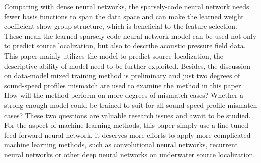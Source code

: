 Comparing with dense neural networks, the sparsely-code neural network needs fewer basis functions to span the data space and can make the learned weight coefficient show group structure, which is beneficial to the feature selection.
These mean the learned sparsely-code neural network model can be used not only to predict source localization, but also to describe acoustic pressure field data. This paper mainly utilizes the model to predict source localization, the descriptive ability of model need to be further exploited.
Besides, the discussion on data-model mixed training method is preliminary and just two degrees of sound-speed profiles mismatch are used to
examine the method in this paper. How will the method perform on more degrees of mismatch cases? Whether a strong enough model could be trained to suit for all sound-speed profile mismatch cases? These two questions are valuable research issues and await to be studied.
For the aspect of machine learning methods, this paper simply use a fine-tuned feed-forward neural network,
it deserves more efforts to apply more complicated machine learning methods, such as convolutional neural networks, recurrent neural networks or other deep neural networks on underwater source localization.

